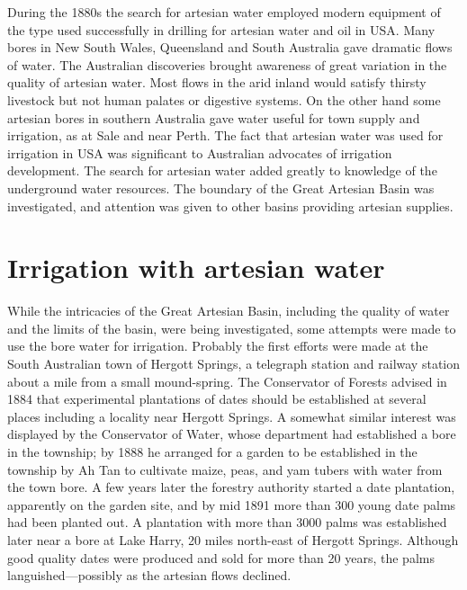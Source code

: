 During the 1880s the search for artesian water employed modern
equipment of the type used successfully in drilling for artesian water
and oil in USA.  Many bores in New South Wales, Queensland and South
Australia gave dramatic flows of water.  The Australian discoveries
brought awareness of great variation in the quality of artesian water.
Most flows in the arid inland would satisfy thirsty livestock but not
human palates or digestive systems.  On the other hand some artesian
bores in southern Australia gave water useful for town supply and
irrigation, as at Sale and near Perth.  The fact that artesian water
was used for irrigation in USA  was significant to
Australian advocates of irrigation development.  The search for
artesian water added greatly to knowledge of the underground water
resources.  The boundary of the Great Artesian Basin was investigated,
and attention was given to other basins providing artesian
supplies.

\section*{Irrigation with artesian water}

While the intricacies of the Great Artesian Basin, including the
quality of water and the limits of the basin, were being investigated,
some attempts were made to use the bore water for irrigation.
Probably the first efforts were made at the South Australian town of
Hergott Springs,  a telegraph station and
railway station about a mile from a small mound-spring.
 The Conservator of Forests advised in 1884 that
 experimental plantations of dates should be established at several
places including a locality near Hergott Springs.  A somewhat similar
interest was displayed by the Conservator of Water, whose department
had established a bore in the township; by 1888 he arranged for a
garden to be established in the township by Ah Tan  to
cultivate maize, peas, and yam tubers with water from the town bore.
A few years later the forestry authority started a date plantation,
apparently on the garden site, and by mid 1891 more than 300 young
date palms had been planted out.  A plantation with more than 3000
palms was established later near a bore at Lake Harry,
 20 miles north-east of Hergott Springs. Although
good quality dates were produced and sold for more than 20 years, the
palms languished---possibly as the artesian flows
declined.

